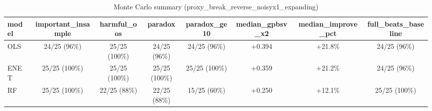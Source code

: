 \begin{table}
\centering
\caption{Monte Carlo summary (proxy_break_reverse_noisyx1_expanding)}
\label{tab:proxy_break_reverse_noisyx1_expanding}
\begin{tabular}{lccccccc}
\toprule
model & important_insample &    harmful_oos &        paradox &   paradox_ge10 & median_gpbsv_x2 & median_improve_pct & full_beats_baseline \\
\midrule
  OLS &       24/25 (96\%) &  25/25 (100\%) &   24/25 (96\%) &   24/25 (96\%) &          +0.394 &            +21.8\% &        24/25 (96\%) \\
 ENET &      25/25 (100\%) &  25/25 (100\%) &  25/25 (100\%) &  25/25 (100\%) &          +0.359 &            +21.2\% &        24/25 (96\%) \\
   RF &      25/25 (100\%) &   22/25 (88\%) &   22/25 (88\%) &   15/25 (60\%) &          +0.250 &            +12.1\% &       25/25 (100\%) \\
\bottomrule
\end{tabular}
\end{table}
